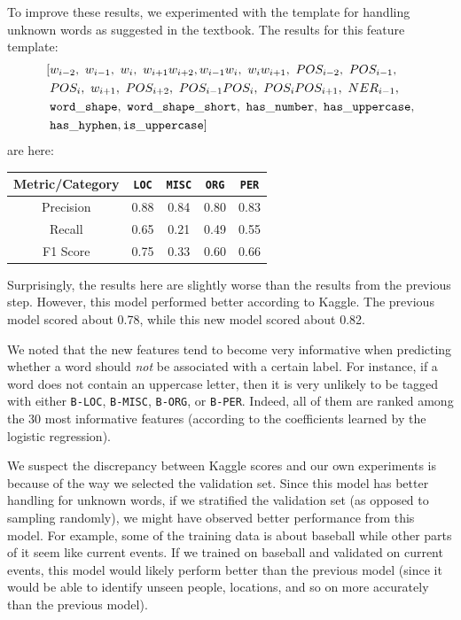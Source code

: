 \documentclass[12pt]{article}
\begin{document}
To improve these results, we experimented with the template for handling unknown words as suggested in the textbook. The results for this feature template:
\begin{equation*}
\begin{split}
[&w_{i - 2},\ w_{i - 1},\ w_i,\ w_{i + 1}w_{i + 2},
w_{i - 1}w_i,\ w_iw_{i + 1},\ POS_{i - 2},\ POS_{i - 1},\\
&POS_i,\ w_{i + 1},\ POS_{i + 2}, \ POS_{i - 1}POS_i,\ POS_iPOS_{i + 1},\ NER_{i - 1},\\
&{\tt word\_shape,\ word\_shape\_short,\ has\_number,\ has\_uppercase,}\\
&{\tt has\_hyphen, is\_uppercase}
]
\end{split}
\end{equation*}
are here:
\begin{center}
	\begin{tabular}{|c|c|c|c|c|}
		\hline
		\textbf{Metric/Category} & {\tt LOC} & {\tt MISC} & {\tt ORG} & {\tt PER}\\
		\hline
		Precision & 0.88 & 0.84 & 0.80 & 0.83\\
		\hline
		Recall & 0.65 & 0.21 & 0.49 & 0.55\\
		\hline
		F1 Score & 0.75 & 0.33 & 0.60 & 0.66\\
		\hline
	\end{tabular}
\end{center}
Surprisingly, the results here are slightly worse than the results from the previous step. However, this model performed better according to Kaggle. The previous model scored about 0.78, while this new model scored about 0.82. 

We noted that the new features tend to become very informative when predicting whether a word should \emph{not} be associated with a certain label. For instance, if a word does not contain an uppercase letter, then it is very unlikely to be tagged with either {\tt B-LOC}, {\tt B-MISC}, {\tt B-ORG}, or {\tt B-PER}. Indeed, all of them are ranked among the 30 most informative features (according to the coefficients learned by the logistic regression).

We suspect the discrepancy between Kaggle scores and our own experiments is because of the way we selected the validation set. Since this model has better handling for unknown words, if we stratified the validation set (as opposed to sampling randomly), we might have observed better performance from this model. For example, some of the training data is about baseball while other parts of it seem like current events. If we trained on baseball and validated on current events, this model would likely perform better than the previous model (since it would be able to identify unseen people, locations, and so on more accurately than the previous model). 
\end{document}
